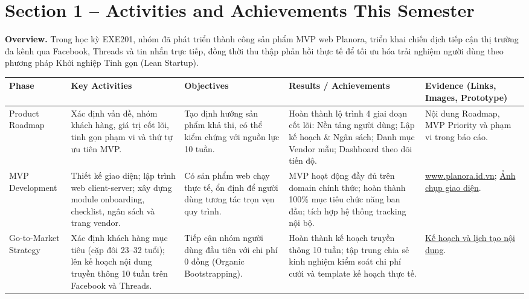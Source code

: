 \documentclass[11pt]{article}
\renewcommand{\arraystretch}{1.25}
\begin{document}
\section*{Section 1 -- Activities and Achievements This Semester}

\textbf{Overview.} Trong học kỳ EXE201, nhóm đã phát triển thành công sản phẩm MVP web Planora, triển khai chiến dịch tiếp cận thị trường đa kênh qua Facebook, Threads và tin nhắn trực tiếp, đồng thời thu thập phản hồi thực tế để tối ưu hóa trải nghiệm người dùng theo phương pháp Khởi nghiệp Tinh gọn (Lean Startup).

\begin{center}
\footnotesize
\renewcommand{\arraystretch}{1.1}
\begin{tabular}{|>{\raggedright\arraybackslash}p{}|>{\raggedright\arraybackslash}p{}|>{\raggedright\arraybackslash}p{}|>{\raggedright\arraybackslash}p{}|>{\raggedright\arraybackslash}p{}|}
\hline
\textbf{Phase} & \textbf{Key Activities} & \textbf{Objectives} & \textbf{Results / Achievements} & \textbf{Evidence (Links, Images, Prototype)} \\
\hline
Product Roadmap & Xác định vấn đề, nhóm khách hàng, giá trị cốt lõi, tinh gọn phạm vi và thứ tự ưu tiên MVP. & Tạo định hướng sản phẩm khả thi, có thể kiểm chứng với nguồn lực 10 tuần. & Hoàn thành lộ trình 4 giai đoạn cốt lõi: Nền tảng người dùng; Lập kế hoạch \& Ngân sách; Danh mục Vendor mẫu; Dashboard theo dõi tiến độ. & Nội dung Roadmap, MVP Priority và phạm vi trong báo cáo. \\
\hline
MVP Development & Thiết kế giao diện; lập trình web client-server; xây dựng module onboarding, checklist, ngân sách và trang vendor. & Có sản phẩm web chạy thực tế, ổn định để người dùng tương tác trọn vẹn quy trình. & MVP hoạt động đầy đủ trên domain chính thức; hoàn thành 100\% mục tiêu chức năng ban đầu; tích hợp hệ thống tracking nội bộ. & \href{https://www.planora.id.vn}{www.planora.id.vn}; \href{https://drive.google.com/drive/folders/17QFpvAA_m3wtimYPhKe0-bYMzgufKLp9?usp=sharing}{Ảnh chụp giao diện}. \\
\hline
Go-to-Market Strategy & Xác định khách hàng mục tiêu (cặp đôi 23--32 tuổi); lên kế hoạch nội dung truyền thông 10 tuần trên Facebook và Threads. & Tiếp cận nhóm người dùng đầu tiên với chi phí 0 đồng (Organic Bootstrapping). & Hoàn thành kế hoạch truyền thông 10 tuần; tập trung chia sẻ kinh nghiệm kiểm soát chi phí cưới và template kế hoạch thực tế. & \href{https://docs.google.com/document/d/1fOqyDUOCmhLDXdhWGvPtCeUn_Bf0PoH7/edit?usp=sharing&ouid=114382309854651798971&rtpof=true&sd=true}{Kế hoạch và lịch tạo nội dung}. \\

\end{tabular}
\end{center}
\end{document}
